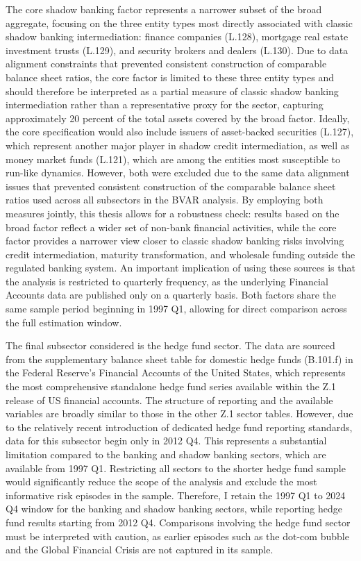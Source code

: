 \documentclass[12pt,a4paper]{report}
\begin{document}
The core shadow banking factor represents a narrower subset of the broad aggregate, focusing on the three entity types most directly associated with classic shadow banking intermediation: finance companies (L.128), mortgage real estate investment trusts (L.129), and security brokers and dealers (L.130). Due to data alignment constraints that prevented consistent construction of comparable balance sheet ratios, the core factor is limited to these three entity types and should therefore be interpreted as a partial measure of classic shadow banking intermediation rather than a representative proxy for the sector, capturing approximately 20 percent of the total assets covered by the broad factor. Ideally, the core specification would also include issuers of asset-backed securities (L.127), which represent another major player in shadow credit intermediation, as well as money market funds (L.121), which are among the entities most susceptible to run-like dynamics. However, both were excluded due to the same data alignment issues that prevented consistent construction of the comparable balance sheet ratios used across all subsectors in the BVAR analysis. By employing both measures jointly, this thesis allows for a robustness check: results based on the broad factor reflect a wider set of non-bank financial activities, while the core factor provides a narrower view closer to classic shadow banking risks involving credit intermediation, maturity transformation, and wholesale funding outside the regulated banking system. An important implication of using these sources is that the analysis is restricted to quarterly frequency, as the underlying Financial Accounts data are published only on a quarterly basis. Both factors share the same sample period beginning in 1997 Q1, allowing for direct comparison across the full estimation window.


The final subsector considered is the hedge fund sector. The data are sourced from the supplementary balance sheet table for domestic hedge funds (B.101.f) in the Federal Reserve's Financial Accounts of the United States, which represents the most comprehensive standalone hedge fund series available within the Z.1 release of US financial accounts. The structure of reporting and the available variables are broadly similar to those in the other Z.1 sector tables. However, due to the relatively recent introduction of dedicated hedge fund reporting standards, data for this subsector begin only in 2012 Q4. This represents a substantial limitation compared to the banking and shadow banking sectors, which are available from 1997 Q1. Restricting all sectors to the shorter hedge fund sample would significantly reduce the scope of the analysis and exclude the most informative risk episodes in the sample. Therefore, I retain the 1997 Q1 to 2024 Q4 window for the banking and shadow banking sectors, while reporting hedge fund results starting from 2012 Q4. Comparisons involving the hedge fund sector must be interpreted with caution, as earlier episodes such as the dot-com bubble and the Global Financial Crisis are not captured in its sample. 
\end{document}
